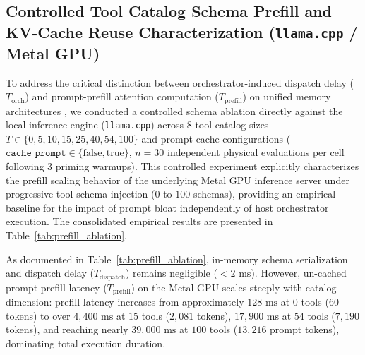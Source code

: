 \documentclass[11pt,a4paper]{article}
\begin{document}
\subsection{Controlled Tool Catalog Schema Prefill and KV-Cache Reuse Characterization (\texttt{llama.cpp} / Metal GPU)}
To address the critical distinction between orchestrator-induced dispatch delay ($T_{\text{orch}}$) and prompt-prefill attention computation ($T_{\text{prefill}}$) on unified memory architectures \cite{kwon2023vllm, williams2009roofline}, we conducted a controlled schema ablation directly against the local inference engine (\texttt{llama.cpp}) across 8 tool catalog sizes $T \in \{0, 5, 10, 15, 25, 40, 54, 100\}$ and prompt-cache configurations ($\texttt{cache\_prompt} \in \{\text{false}, \text{true}\}$, $n=30$ independent physical evaluations per cell following 3 priming warmups). This controlled experiment explicitly characterizes the prefill scaling behavior of the underlying Metal GPU inference server under progressive tool schema injection ($0$ to $100$ schemas), providing an empirical baseline for the impact of prompt bloat independently of host orchestrator execution. The consolidated empirical results are presented in Table~\ref{tab:prefill_ablation}.



As documented in Table~\ref{tab:prefill_ablation}, in-memory schema serialization and dispatch delay ($T_{\text{dispatch}}$) remains negligible ($< 2\text{ ms}$). However, un-cached prompt prefill latency ($T_{\text{prefill}}$) on the Metal GPU scales steeply with catalog dimension: prefill latency increases from approximately $128\text{ ms}$ at $0$ tools ($60$ tokens) to over $4{,}400\text{ ms}$ at $15$ tools ($2{,}081$ tokens), $17{,}900\text{ ms}$ at $54$ tools ($7{,}190$ tokens), and reaching nearly $39{,}000\text{ ms}$ at $100$ tools ($13{,}216$ prompt tokens), dominating total execution duration.
\end{document}
